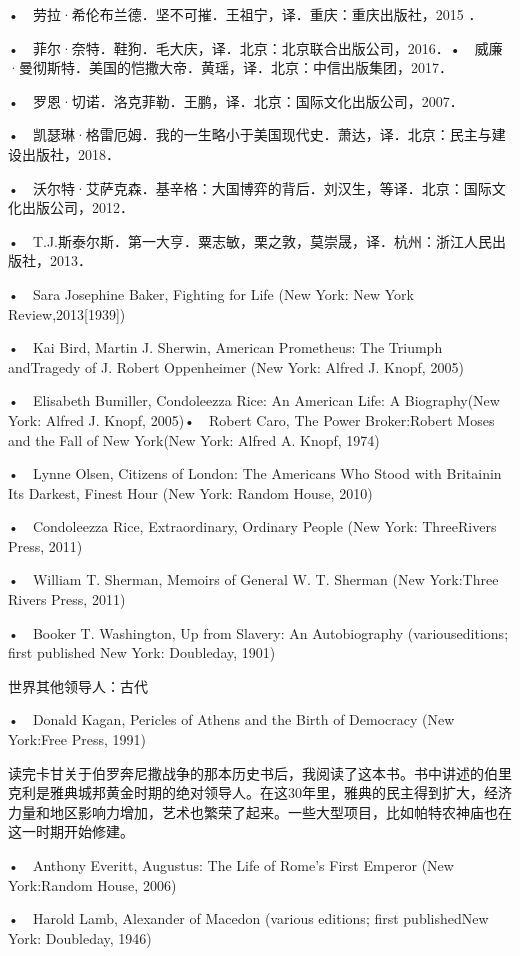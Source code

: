 •　劳拉·希伦布兰德．坚不可摧．王祖宁，译．重庆：重庆出版社，2015
．

•　菲尔·奈特．鞋狗．毛大庆，译．北京：北京联合出版公司，2016．•　威廉·曼彻斯特．美国的恺撒大帝．黄瑶，译．北京：中信出版集团，2017．

•　罗恩·切诺．洛克菲勒．王鹏，译．北京：国际文化出版公司，2007．

•　凯瑟琳·格雷厄姆．我的一生略小于美国现代史．萧达，译．北京：民主与建设出版社，2018．

•　沃尔特·艾萨克森．基辛格：大国博弈的背后．刘汉生，等译．北京：国际文化出版公司，2012．

•　T.J.斯泰尔斯．第一大亨．粟志敏，栗之敦，莫崇晟，译．杭州：浙江人民出版社，2013．


•　Sara Josephine Baker, Fighting for Life (New York: New York Review,2013[1939])

•　Kai Bird, Martin J. Sherwin, American Prometheus: The Triumph andTragedy of J. Robert Oppenheimer (New York: Alfred J. Knopf, 2005)


•　Elisabeth Bumiller, Condoleezza Rice: An American Life: A Biography(New York: Alfred J. Knopf, 2005)•　Robert Caro, The Power Broker:Robert Moses and the Fall of New York(New York: Alfred A. Knopf, 1974)


•　Lynne Olsen, Citizens of London: The Americans Who Stood with Britainin Its Darkest, Finest Hour (New York: Random House, 2010)


•　Condoleezza Rice, Extraordinary, Ordinary People (New York: ThreeRivers Press, 2011)


•　William T. Sherman, Memoirs of General W. T. Sherman (New York:Three Rivers Press, 2011)

•　Booker T. Washington, Up from Slavery: An Autobiography (variouseditions; first published New York: Doubleday, 1901)


世界其他领导人：古代

•　Donald Kagan, Pericles of Athens and the Birth of Democracy (New York:Free Press, 1991)

读完卡甘关于伯罗奔尼撒战争的那本历史书后，我阅读了这本书。书中讲述的伯里克利是雅典城邦黄金时期的绝对领导人。在这30年里，雅典的民主得到扩大，经济力量和地区影响力增加，艺术也繁荣了起来。一些大型项目，比如帕特农神庙也在这一时期开始修建。

•　Anthony Everitt, Augustus: The Life of Rome’s First Emperor (New York:Random House, 2006)

•　Harold Lamb, Alexander of Macedon (various editions; first publishedNew York: Doubleday, 1946)

